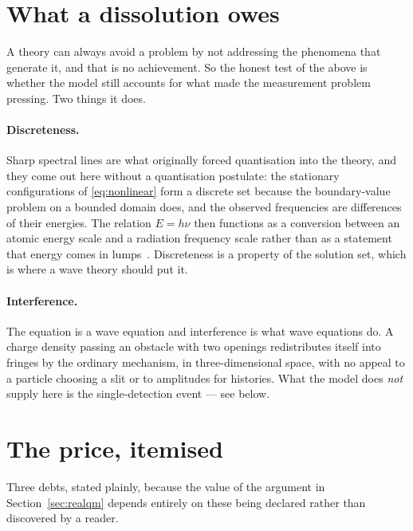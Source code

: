 \documentclass[11pt]{article}
\begin{document}
\section{What a dissolution owes}\label{sec:owes}

A theory can always avoid a problem by not addressing the phenomena that generate it, and that is
no achievement. So the honest test of the above is whether the model still accounts for what made
the measurement problem pressing. Two things it does.

\paragraph{Discreteness.} Sharp spectral lines are what originally forced quantisation into the
theory, and they come out here without a quantisation postulate: the stationary configurations of
\eqref{eq:nonlinear} form a discrete set because the boundary-value problem on a bounded domain
does, and the observed frequencies are differences of their energies. The relation $E = h\nu$ then
functions as a conversion between an atomic energy scale and a radiation frequency scale rather
than as a statement that energy comes in lumps~\cite{RealQM}. Discreteness is a property of the
solution set, which is where a wave theory should put it.

\paragraph{Interference.} The equation is a wave equation and interference is what wave equations
do. A charge density passing an obstacle with two openings redistributes itself into fringes by
the ordinary mechanism, in three-dimensional space, with no appeal to a particle choosing a slit or
to amplitudes for histories. What the model does \emph{not} supply here is the single-detection
event --- see below.

\section{The price, itemised}\label{sec:price}

Three debts, stated plainly, because the value of the argument in Section~\ref{sec:realqm} depends
entirely on these being declared rather than discovered by a reader.
\end{document}
